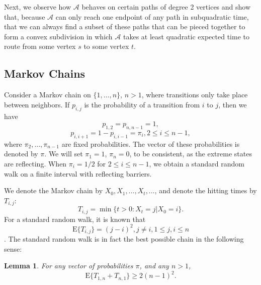 \documentclass [letterpaper] {patmorin}
\newtheorem{lemma}{Lemma}%
\newcommand{\EXP}{\mathrm{E}}
\begin{document}
Next, we observe how $\mathcal{A}$ behaves on certain paths of degree 2 vertices and show that, because $\mathcal{A}$ can only reach one endpoint of any path in subquadratic time, that we can always find a subset of these paths that can be pieced together to form a convex subdivision in which $\mathcal{A}$ takes at least quadratic expected time to route from some vertex $s$ to some vertex $t$.

\subsection{Markov Chains}
\label{sec:markov}

Consider a Markov chain on $\{ 1, \ldots, n \}$, $n > 1$, where transitions only
take place between neighbors. If $p_{i,j}$ is the probability of a transition
from $i$ to $j$, then we have 
\[
p_{1,2} = p_{n,n-1} = 1,
\]
\[
p_{i,i+1} = 1-p_{i,i-1} = \pi_i, 2 \le i \le n-1,
\]
where $\pi_2, \ldots, \pi_{n-1}$ are fixed probabilities.
The vector of these probabilities is denoted by $\pi$.
We will set $\pi_1 = 1$, $\pi_n = 0$, to be consistent, as the
extreme states are reflecting.  When $\pi_i = 1/2$ for $2 \le i \le n-1$,
we obtain a standard random walk on a finite interval with reflecting barriers.

We denote the Markov chain by $X_0, X_1, \ldots, X_t , \ldots$,
and denote the hitting times by $T_{i,j}$:
\[
T_{i,j} = \min \{ t > 0: X_t = j | X_0 = i \}.
\]
For a standard random walk, it is known that
\[
\EXP \{ T_{i,j} \} = (j-i)^2, j \not= i, 1 \le j,i \le n
\]
\cite{m73}.  The standard random walk is in fact the best possible chain in the following sense:

\begin{lemma}\label{lemma:backandforth}
For any vector of probabilities $\pi$, and any $n > 1$,
\[
\EXP \{ T_{1,n} + T_{n,1} \} \ge 2 (n-1)^2.
\]
\end{lemma}
\end{document}
